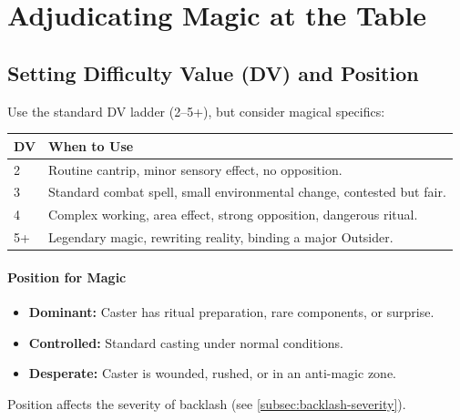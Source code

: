 \section{Adjudicating Magic at the Table}
\label{sec:magic-adjudication}

\subsection*{Setting Difficulty Value (DV) and Position}
Use the standard DV ladder (2--5+), but consider magical specifics:

\begin{tcolorbox}[title=DV for Magic, colback=white!97!gray, colframe=black!80!gray,breakable]
\begin{tabularx}{\textwidth}{lX}
\toprule
\textbf{DV} & \textbf{When to Use} \\
\midrule
2 & Routine cantrip, minor sensory effect, no opposition. \\
3 & Standard combat spell, small environmental change, contested but fair. \\
4 & Complex working, area effect, strong opposition, dangerous ritual. \\
5+ & Legendary magic, rewriting reality, binding a major Outsider. \\
\bottomrule
\end{tabularx}
\end{tcolorbox}

\paragraph{Position for Magic}
\begin{itemize}
  \item \textbf{Dominant:} Caster has ritual preparation, rare components, or surprise.
  \item \textbf{Controlled:} Standard casting under normal conditions.
  \item \textbf{Desperate:} Caster is wounded, rushed, or in an anti-magic zone.
\end{itemize}
Position affects the severity of backlash (see \ref{subsec:backlash-severity}).

